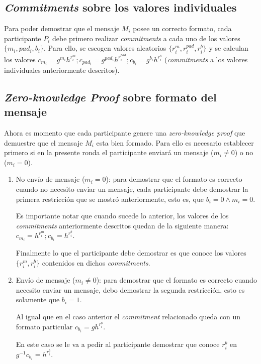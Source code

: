 \subsection{\emph{Commitments} sobre los valores individuales}

Para poder demostrar que el mensaje $M_i$ posee un correcto formato, cada participante $P_i$  
debe primero realizar \emph{commitments} a cada uno de los valores $\{m_i, pad_i, b_i\}$. 
Para ello, se escogen valores aleatorios $\{r_i^m, r_i^{pad}, r_i^b\}$ y se calculan 
los valores $c_{m_i} = g^{m_i} h^{r_i^m}; c_{pad_i} = g^{pad_i} h^{r_i^{pad}}; c_{b_i} = g^{b_i} h^{r_i^b}$ 
(\emph{commitments} a los valores individuales anteriormente descritos).

\subsection{\emph{Zero-knowledge Proof} sobre formato del mensaje}

Ahora es momento que cada participante genere una \emph{zero-knowledge proof} que 
demuestre que el mensaje $M_i$ esta bien formado. Para ello es necesario establecer 
primero si en la presente ronda el participante enviará un mensaje ($m_i \neq 0$) o 
no ($m_i = 0$).

\begin{enumerate}
    \item No envío de mensaje ($m_i = 0$): para demostrar que el formato es correcto 
    cuando no necesito enviar un mensaje, cada participante debe demostrar la primera 
    restricción que se mostró anteriormente, esto es, que $b_i = 0 \land m_i = 0$.
    
    Es importante notar que cuando sucede lo anterior, los valores de los 
    \emph{commitments} anteriormente descritos quedan de la siguiente manera: 
    $c_{m_i} = h^{r_i^m}; c_{b_i} = h^{r_i^b}$.
    
    Finalmente lo que el participante debe demostrar es que conoce los valores 
    $\{r_i^m, r_i^b\}$ contenidos en dichos \emph{commitments}.
    \item Envío de mensaje ($m_i \neq 0$): para demostrar que el formato es 
    correcto cuando necesito enviar un mensaje, debo demostrar la segunda 
    restricción, esto es solamente que $b_i = 1$.
    
    Al igual que en el caso anterior el \emph{commitment} relacionado queda con 
    un formato particular $c_{b_i} = g h^{r_i^b}$.
    
    En este caso se le va a pedir al participante demostrar que conoce $r_i^b$ 
    en $g^{-1} c_{b_i} = h^{r_i^b}$.
\end{enumerate}

